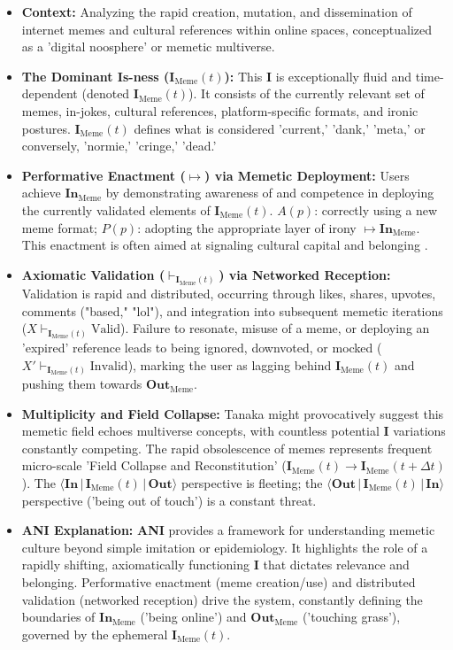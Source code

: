 \documentclass{article}
\newcommand{\ANI}{\textbf{ANI}}             %
\newcommand{\Isness}{\mathbf{I}}            %
\newcommand{\Inness}{\mathbf{In}}           %
\newcommand{\Outness}{\mathbf{Out}}         %
\newcommand{\enactment}{\ensuremath{\mapsto}} %
\newcommand{\validates}[1]{\ensuremath{\vdash_{#1}}} %
\newcommand{\orientation}[3]{\ensuremath{\langle #1 \,|\, #2 \,|\, #3 \rangle}} %
\begin{document}
\begin{itemize}
    \item \textbf{Context:} Analyzing the rapid creation, mutation, and dissemination of internet memes and cultural references within online spaces, conceptualized as a 'digital noosphere' \citep{Castells2000} or memetic multiverse.
    \item \textbf{The Dominant Is-ness ($\Isness_{\text{Meme}}(t)$):} This $\Isness$ is exceptionally fluid and time-dependent (denoted $\Isness_{\text{Meme}}(t)$). It consists of the currently relevant set of memes, in-jokes, cultural references, platform-specific formats, and ironic postures. $\Isness_{\text{Meme}}(t)$ defines what is considered 'current,' 'dank,' 'meta,' or conversely, 'normie,' 'cringe,' 'dead.'
    \item \textbf{Performative Enactment ($\enactment$) via Memetic Deployment:} Users achieve $\Inness_{\text{Meme}}$ by demonstrating awareness of and competence in deploying the currently validated elements of $\Isness_{\text{Meme}}(t)$. $A(p)$: correctly using a new meme format; $P(p)$: adopting the appropriate layer of irony $\enactment \Inness_{\text{Meme}}$. This enactment is often aimed at signaling cultural capital and belonging \citep{Bourdieu1984}.
    \item \textbf{Axiomatic Validation ($\validates{\Isness_{\text{Meme}}(t)}$) via Networked Reception:} Validation is rapid and distributed, occurring through likes, shares, upvotes, comments ("based," "lol"), and integration into subsequent memetic iterations ($X \validates{\Isness_{\text{Meme}}(t)} \text{Valid}$). Failure to resonate, misuse of a meme, or deploying an 'expired' reference leads to being ignored, downvoted, or mocked ($X' \validates{\Isness_{\text{Meme}}(t)} \text{Invalid}$), marking the user as lagging behind $\Isness_{\text{Meme}}(t)$ and pushing them towards $\Outness_{\text{Meme}}$.
    \item \textbf{Multiplicity and Field Collapse:} Tanaka might provocatively suggest this memetic field echoes multiverse concepts, with countless potential $\Isness$ variations constantly competing. The rapid obsolescence of memes \citep{Dawkins1976} represents frequent micro-scale 'Field Collapse and Reconstitution' ($\Isness_{\text{Meme}}(t) \rightarrow \Isness_{\text{Meme}}(t+\Delta t)$). The $\orientation{\Inness}{\Isness_{\text{Meme}}(t)}{\Outness}$ perspective is fleeting; the $\orientation{\Outness}{\Isness_{\text{Meme}}(t)}{\Inness}$ perspective ('being out of touch') is a constant threat.
    \item \textbf{ANI Explanation:} \ANI{} provides a framework for understanding memetic culture beyond simple imitation or epidemiology. It highlights the role of a rapidly shifting, axiomatically functioning $\Isness$ that dictates relevance and belonging. Performative enactment (meme creation/use) and distributed validation (networked reception) drive the system, constantly defining the boundaries of $\Inness_{\text{Meme}}$ ('being online') and $\Outness_{\text{Meme}}$ ('touching grass'), governed by the ephemeral $\Isness_{\text{Meme}}(t)$.
\end{itemize}
\end{document}
